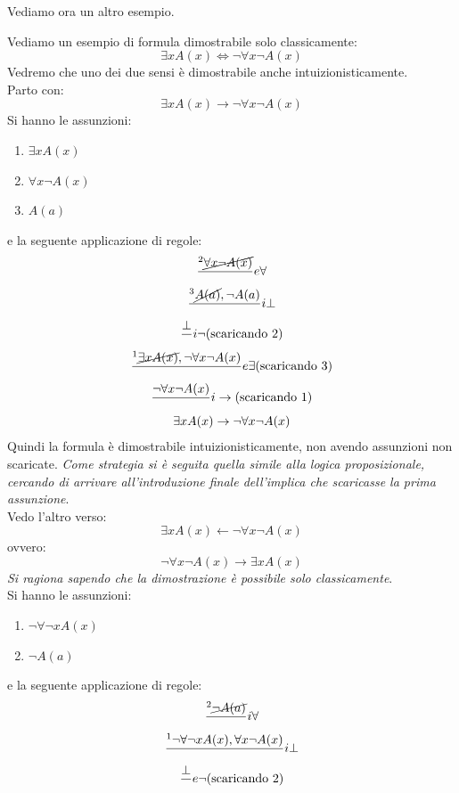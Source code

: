 \documentclass[a4paper,12pt, oneside]{book}
\begin{document}
Vediamo ora un altro esempio.
\begin{esempio}
  Vediamo un esempio di formula dimostrabile solo classicamente:
  \[\exists xA(x)\iff \neg \forall x\neg A(x)\]
  Vedremo che uno dei due sensi è dimostrabile anche intuizionisticamente.\\
  Parto con:
  \[\exists xA(x)\to \neg \forall x\neg A(x)\]
  Si hanno le assunzioni:
  \begin{enumerate}
    \item $\exists xA(x)$
    \item $\forall x\neg A(x)$
    \item $A(a)$
  \end{enumerate}
  e la seguente applicazione di regole:
  \begin{gather*}
    \frac{^2\cancel{\forall x\neg A(x)}}{}e\forall\\
    \frac{^3 \cancel{A(a)}, \neg A(a)}{}i\bot\\
    \frac{\bot}{}i\neg\mbox{(scaricando 2)}\\
    \frac{^1\cancel{\exists xA(x)},\neg\forall x\neg
      A(x)}{}e\exists\mbox{(scaricando 3)}\\
    \frac{\neg\forall x\neg A(x)}{}i\to\mbox{(scaricando 1)}\\
    \exists x A(x)\to  \neg \forall x\neg A(x)
  \end{gather*}
  Quindi la formula è dimostrabile intuizionisticamente, non avendo assunzioni
  non scaricate. \textit{Come strategia si è seguita quella simile alla logica
  proposizionale, cercando di arrivare all'introduzione finale dell'implica che
  scaricasse la prima assunzione}.\\
  Vedo l'altro verso:
  \[\exists xA(x)\gets \neg \forall x\neg A(x)\]
  ovvero:
  \[\neg \forall x\neg A(x)\to\exists xA(x)\]
  \emph{Si ragiona sapendo che la dimostrazione è possibile solo
    classicamente}.\\
  Si hanno le assunzioni:
  \begin{enumerate}
    \item $\neg \forall\neg x A(x)$
    \item $\neg A(a)$
  \end{enumerate}
  e la seguente applicazione di regole:
  \begin{gather*}
    \frac{^2\cancel{\neg A(a)}}{}i\forall\\
    \frac{^1 \neg \forall\neg x A(x),\forall x \neg A(x)}{}i\bot\\
    \frac{\bot}{}e\neg\mbox{(scaricando 2)}\\

\end{gather*}
\end{esempio}
\end{document}
